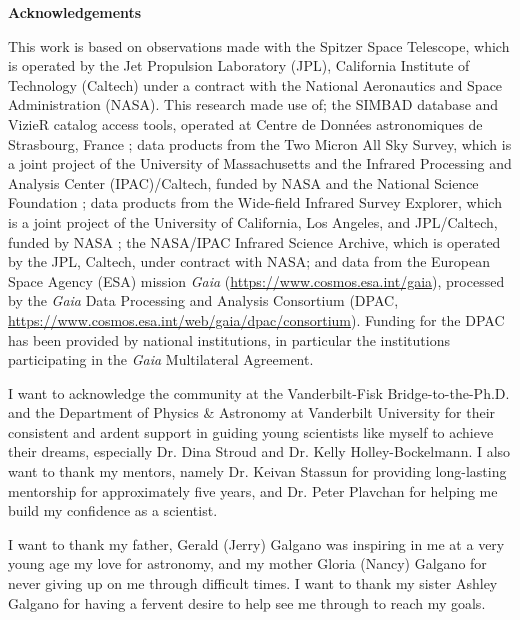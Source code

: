 {}

\noindent \textbf{Acknowledgements}


This work is based on observations made with the Spitzer Space Telescope, which is operated by the Jet Propulsion Laboratory (JPL), California Institute of Technology (Caltech) under a contract with the National Aeronautics and Space Administration (NASA). This research made use of; the SIMBAD database and VizieR catalog access tools, operated at Centre de Donn\'ees astronomiques de Strasbourg, France \citep{VIZIER}; data products from the Two Micron All Sky Survey, which is a joint project of the University of Massachusetts and the Infrared Processing and Analysis Center (IPAC)/Caltech, funded by NASA and the National Science Foundation \citep{2MASS}; data products from the Wide-field Infrared Survey Explorer, which is a joint project of the University of California, Los Angeles, and JPL/Caltech, funded by NASA \citep{WISE}; the NASA/IPAC Infrared Science Archive, which is operated by the JPL, Caltech, under contract with NASA; and data from the European Space Agency (ESA) mission {\it Gaia} (\url{https://www.cosmos.esa.int/gaia}), processed by the {\it Gaia} Data Processing and Analysis Consortium (DPAC, \url{https://www.cosmos.esa.int/web/gaia/dpac/consortium}). Funding for the DPAC has been provided by national institutions, in particular the institutions participating in the {\it Gaia} Multilateral Agreement.

I want to acknowledge the community at the Vanderbilt-Fisk Bridge-to-the-Ph.D. and the Department of Physics \& Astronomy at Vanderbilt University for their consistent and ardent support in guiding young scientists like myself to achieve their dreams, especially Dr. Dina Stroud and Dr. Kelly Holley-Bockelmann.  I also want to thank my mentors, namely Dr. Keivan Stassun for providing long-lasting mentorship for approximately five years, and Dr. Peter Plavchan for helping me build my confidence as a scientist.

I want to thank my father, Gerald (Jerry) Galgano was inspiring in me at a very young age my love for astronomy, and my mother Gloria (Nancy) Galgano for never giving up on me through difficult times. I want to thank my sister Ashley Galgano for having a fervent desire to help see me through to reach my goals.